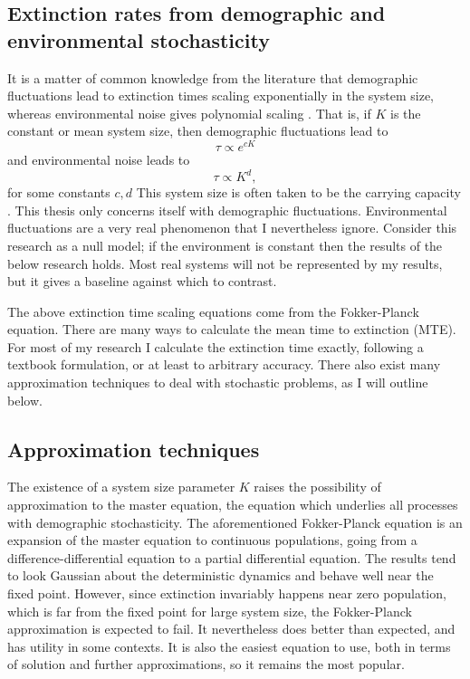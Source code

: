 \subsection{Extinction rates from demographic and environmental stochasticity}
It is a matter of common knowledge from the literature that demographic fluctuations lead to extinction times scaling exponentially in the system size, whereas environmental noise gives polynomial scaling \cite{Ovaskainen20X6}. 
That is, if $K$ is the constant or mean system size, then demographic fluctuations lead to
\begin{equation*}
\tau \propto e^{cK}
\end{equation*}
and environmental noise leads to
\begin{equation*}
\tau \propto K^d,
\end{equation*}
for some constants $c,d$
This system size is often taken to be the carrying capacity \cite{um...}. 
This thesis only concerns itself with demographic fluctuations. 
Environmental fluctuations are a very real phenomenon that I nevertheless ignore. 
Consider this research as a null model; if the environment is constant then the results of the below research holds. 
Most real systems will not be represented by my results, but it gives a baseline against which to contrast. 

The above extinction time scaling equations come from the Fokker-Planck equation. 
There are many ways to calculate the mean time to extinction (MTE). 
For most of my research I calculate the extinction time exactly, following a textbook formulation, or at least to arbitrary accuracy. 
There also exist many approximation techniques to deal with stochastic problems, as I will outline below. 


\subsection{Approximation techniques}
The existence of a system size parameter $K$ raises the possibility of approximation to the master equation, the equation which underlies all processes with demographic stochasticity. 
The aforementioned Fokker-Planck equation is an expansion of the master equation to continuous populations, going from a difference-differential equation to a partial differential equation. 
The results tend to look Gaussian about the deterministic dynamics and behave well near the fixed point. 
However, since extinction invariably happens near zero population, which is far from the fixed point for large system size, the Fokker-Planck approximation is expected to fail. 
It nevertheless does better than expected, and has utility in some contexts. 
It is also the easiest equation to use, both in terms of solution and further approximations, so it remains the most popular. 

